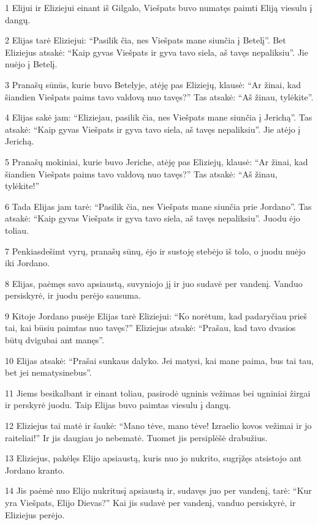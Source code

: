 \par 1 Elijui ir Eliziejui einant iš Gilgalo, Viešpats buvo numatęs paimti Eliją viesulu į dangų. 
\par 2 Elijas tarė Eliziejui: “Pasilik čia, nes Viešpats mane siunčia į Betelį”. Bet Eliziejus atsakė: “Kaip gyvas Viešpats ir gyva tavo siela, aš tavęs nepaliksiu”. Jie nuėjo į Betelį. 
\par 3 Pranašų sūnūs, kurie buvo Betelyje, atėję pas Eliziejų, klausė: “Ar žinai, kad šiandien Viešpats paims tavo valdovą nuo tavęs?” Tas atsakė: “Aš žinau, tylėkite”. 
\par 4 Elijas sakė jam: “Eliziejau, pasilik čia, nes Viešpats mane siunčia į Jerichą”. Tas atsakė: “Kaip gyvas Viešpats ir gyva tavo siela, aš tavęs nepaliksiu”. Jie atėjo į Jerichą. 
\par 5 Pranašų mokiniai, kurie buvo Jeriche, atėję pas Eliziejų, klausė: “Ar žinai, kad šiandien Viešpats paims tavo valdovą nuo tavęs?” Tas atsakė: “Aš žinau, tylėkite!” 
\par 6 Tada Elijas jam tarė: “Pasilik čia, nes Viešpats mane siunčia prie Jordano”. Tas atsakė: “Kaip gyvas Viešpats ir gyva tavo siela, aš tavęs nepaliksiu”. Juodu ėjo toliau. 
\par 7 Penkiasdešimt vyrų, pranašų sūnų, ėjo ir sustoję stebėjo iš tolo, o juodu nuėjo iki Jordano. 
\par 8 Elijas, paėmęs savo apsiaustą, suvyniojo jį ir juo sudavė per vandenį. Vanduo persiskyrė, ir juodu perėjo sausuma. 
\par 9 Kitoje Jordano pusėje Elijas tarė Eliziejui: “Ko norėtum, kad padaryčiau prieš tai, kai būsiu paimtas nuo tavęs?” Eliziejus atsakė: “Prašau, kad tavo dvasios būtų dvigubai ant manęs”. 
\par 10 Elijas atsakė: “Prašai sunkaus dalyko. Jei matysi, kai mane paima, bus tai tau, bet jei nematysi­nebus”. 
\par 11 Jiems besikalbant ir einant toliau, pasirodė ugninis vežimas bei ugniniai žirgai ir perskyrė juodu. Taip Elijas buvo paimtas viesulu į dangų. 
\par 12 Eliziejus tai matė ir šaukė: “Mano tėve, mano tėve! Izraelio kovos vežimai ir jo raiteliai!” Ir jis daugiau jo nebematė. Tuomet jis persiplėšė drabužius. 
\par 13 Eliziejus, pakėlęs Elijo apsiaustą, kuris nuo jo nukrito, sugrįžęs atsistojo ant Jordano kranto. 
\par 14 Jis paėmė nuo Elijo nukritusį apsiaustą ir, sudavęs juo per vandenį, tarė: “Kur yra Viešpats, Elijo Dievas?” Kai jis sudavė per vandenį, vanduo persiskyrė, ir Eliziejus perėjo. 
